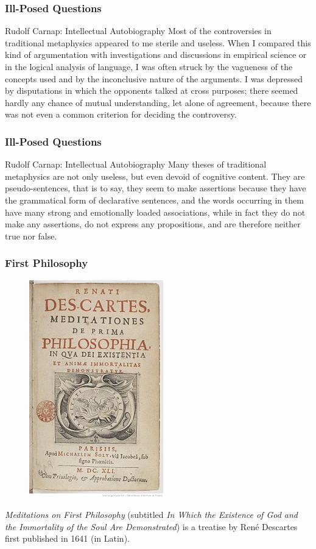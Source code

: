 \documentclass[xcolor=dvipsnames]{beamer}
\begin{document}
\begin{frame}
  \frametitle{Ill-Posed Questions}
  \begin{block}{Rudolf Carnap: Intellectual Autobiography}
    Most of the controversies in traditional metaphysics appeared to
    me sterile and useless. When I compared this kind of argumentation
    with investigations and discussions in empirical science or in the
    logical analysis of language, I was often struck by the vagueness
    of the concepts used and by the inconclusive nature of the
    arguments. I was depressed by disputations in which the opponents
    talked at cross purposes; there seemed hardly any chance of mutual
    understanding, let alone of agreement, because there was not even
    a common criterion for deciding the controversy.
\end{block}
\end{frame}

\begin{frame}
  \frametitle{Ill-Posed Questions}
  \begin{block}{Rudolf Carnap: Intellectual Autobiography}
    Many theses of traditional metaphysics are not only useless, but
    even devoid of cognitive content. They are pseudo-sentences, that
    is to say, they seem to make assertions because they have the
    grammatical form of declarative sentences, and the words
    occurring in them have many strong and emotionally loaded
    associations, while in fact they do not make any assertions, do
    not express any propositions, and are therefore neither true nor
    false.
\end{block}
\end{frame}

\begin{frame}
  \frametitle{First Philosophy}
  \begin{figure}[h]
    \includegraphics[scale=0.5]{./prima.jpg}
  \end{figure}
  \emph{Meditations on First Philosophy} (subtitled \emph{In Which the
    Existence of God and the Immortality of the Soul Are
    Demonstrated}) is a treatise by Ren{\'e} Descartes
  first published in 1641 (in Latin).
\end{frame}
\end{document}
